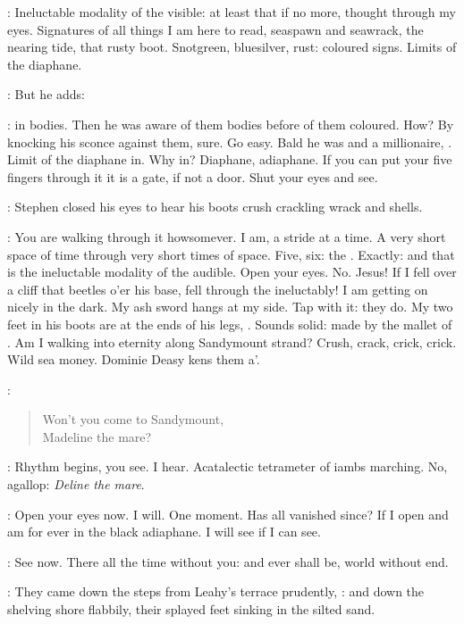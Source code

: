 \StephenInt:
Ineluctable modality of the visible:
at least that if no more, thought through my eyes.
Signatures of all things I am here to read,
seaspawn and seawrack,
the nearing tide,
that rusty boot.
Snotgreen, bluesilver, rust:
coloured signs.
Limits of the diaphane.

:
But he adds:

\StephenInt:
in bodies.
Then he was aware of them bodies before of them coloured.
How?
By knocking his sconce against them, sure.
Go easy.
Bald he was and a millionaire,
.
Limit of the diaphane in.
Why in?
Diaphane, adiaphane.
If you can put your five fingers through it it is a gate,
if not a door.
Shut your eyes and see.

:
Stephen closed his eyes to hear his boots
crush crackling wrack and shells.

\StephenInt:
You are walking through it howsomever.
I am, a stride at a time.
A very short space of time through very short times of space.
Five, six: the .
Exactly: and that is the ineluctable modality of the audible.
Open your eyes.
No.
Jesus!
If I fell over a cliff that beetles o'er his base,
fell through the  ineluctably!
I am getting on nicely in the dark.
My ash sword hangs at my side.
Tap with it: they do.
My two feet in his boots are at the ends of his legs, .
Sounds solid:
made by the mallet of .
Am I walking into eternity along Sandymount strand?
Crush, crack, crick, crick.
Wild sea money.
Dominie Deasy kens
them a'.

:
\begin{verse}
    Won't you come to Sandymount, \\
    Madeline the mare?
\end{verse}

\StephenInt:
Rhythm begins, you see.
I hear.
Acatalectic tetrameter of iambs marching.
No, agallop:
\emph{Deline the mare}.

\StephenInt:
Open your eyes now.
I will.
One moment.
Has all vanished since?
If I open and am for ever in the black adiaphane.
I will see if I can see.

\StephenInt:
See now.
There all the time without you:
and ever shall be,
world without end.

:
They came down the steps from Leahy's terrace prudently,
:
and down the shelving shore flabbily,
their splayed feet sinking in the silted sand.

